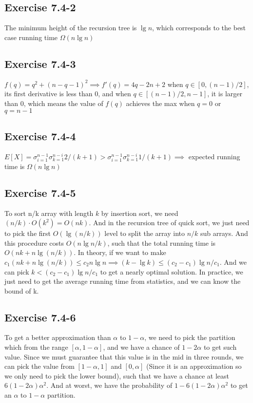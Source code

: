 \documentclass[12pt]{article}
\theoremstyle{definition}
\theoremstyle{remark}
\begin{document}
\subsection*{Exercise 7.4-2}
The minimum height of the recursion tree is $\lg{n}$, which corresponds to the best case running time $\Omega(n\lg n)$
\subsection*{Exercise 7.4-3}
$f(q)=q^2+(n-q-1)^2\implies f'(q)=4q-2n+2$ when $q\in[0,(n-1)/2]$, its first derivative is less than 0, and when $q\in[(n-1)/2,n-1]$, it is larger than 0, which means the value of $f(q)$ achieves the max when $q=0$ or $q=n-1$
\subsection*{Exercise 7.4-4}
$E[X]=\sigma_{i=1}^{n-1}\sigma_{k=1}^{n-i}2/(k+1)>\sigma_{i=1}^{n-1}\sigma_{k=1}^{n-i}1/(k+1)\implies$ expected running time is $\Omega(n\lg n)$
\subsection*{Exercise 7.4-5}
To sort n/k array with length $k$ by insertion sort, we need $(n/k)\cdot O(k^2)=O(nk)$. And in the recursion tree of quick sort, we just need to pick the first $O(\lg(n/k))$ level to split the array into $n/k$ sub arrays. And this procedure costs $O(n\lg{n/k})$, such that the total running time is $O(nk+n\lg(n/k))$. In theory, if we want to make $c_1(nk+n\lg(n/k))\le c_2n\lg n\implies (k-\lg k)\le (c_2-c_1)\lg n/c_1$. And we can pick $k< (c_2-c_1)\lg n/c_1$ to get a nearly optimal solution. In practice, we just need to get the average running time from statistics, and we can know the bound of k.
\subsection*{Exercise 7.4-6}
To get a better approximation than $\alpha$ to $1-\alpha$, we need to pick the partition which from the range $[\alpha, 1-\alpha]$, and we have a chance of $1-2\alpha$ to get such value. Since we must guarantee that this value is in the mid in three rounds, we can pick the value from $[1-\alpha,1]$ and $[0,\alpha]$ (Since it is an approximation so we only need to pick the lower bound), such that we have a chance at least $6(1-2\alpha)\alpha^2$. And at worst, we have the probability of $1-6(1-2\alpha)\alpha^2$ to get an $\alpha$ to $1-\alpha$ partition.
\end{document}
